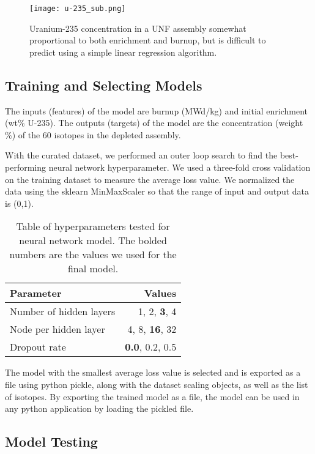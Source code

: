 \begin{figure}
    \centering
    \texttt{[image: u-235\_sub.png]}
    \caption{Uranium-235 concentration in a \gls{UNF} assembly
             somewhat proportional to both enrichment and
             burnup, but is difficult to predict using
             a simple linear regression algorithm.}
    \label{fig:u_235}
\end{figure}


\subsection{Training and Selecting Models}

The inputs (features) of the model are
burnup (MWd/kg) and initial enrichment (wt\% U-235).
The outputs (targets) of the model are
the concentration (weight \%) of the 60 isotopes in the
depleted assembly.

With the curated dataset, we performed an outer loop
search to find the best-performing neural network
hyperparameter. We used a three-fold
cross validation on the training dataset to
measure the average loss value. We
normalized the data using the sklearn MinMaxScaler
so that the range of input and output data is (0,1).

\begin{table}[h]
    \centering
    \begin{tabular}{lr}
        \hline
        Parameter & Values \\
        \hline
        Number of hidden layers & 1, 2, \textbf{3}, 4 \\
        Node per hidden layer & 4, 8, \textbf{16}, 32 \\
        Dropout rate & \textbf{0.0}, 0.2, 0.5 \\
        \hline
    \end{tabular}
    \caption{Table of hyperparameters tested
             for neural network model. The bolded
             numbers are the values we used for the final model.}
\end{table}

The model with the smallest average loss value
is selected and is exported as a file using python
pickle, along with the dataset scaling objects, as well as
the list of isotopes. By exporting the trained model
as a file, the model can be used in any python
application by loading the pickled file.


\subsection{Model Testing}

